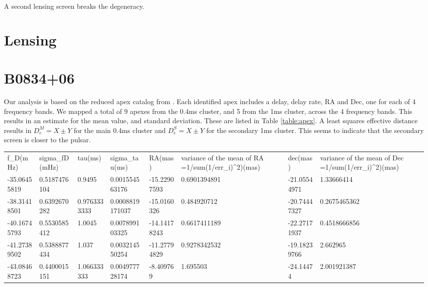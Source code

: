 \documentclass[useAMS,usenatbib]{mn2e}
\begin{document}
A second lensing screen breaks the degeneracy.

\section{Lensing}

\section{B0834+06}

Our analysis is based on the reduced apex catalog from
\citet{2010ApJ...708..232B}. Each identified apex includes a delay,
delay rate, RA and Dec, one for each of 4 frequency bands.  We mapped
a total of 9 apexes from the 0.4ms cluster, and 5 from the 1ms
cluster, across the 4 frequency bands.  This results in an estimate
for the mean value, and standard deviation.  These are listed in Table
\ref{table:apex}.  A least squares effective distance results in
$D_e^M=X\pm Y$ for the main 0.4ms cluster and $D_e^S = X \pm Y$ for
the secondary 1ms cluster.  This seems to indicate that the secondary
screen is closer to the pulsar.

\begin{table}[h]
\begin{tabular}{llllllll}
f\_D(mHz)    & sigma\_fD(mHz) & tau(ms)      & sigma\_tau(ms)  & RA(mas)      & variance of the mean of RA =1/sum(1/err\_i)\textasciicircum 2)(mas) & dec(mas)     & variance of the mean of Dec =1/sum(1/err\_i)\textasciicircum 2)(mas) \\
-35.06455819 & 0.5187476104   & 0.9495       & 0.001554563176  & -15.22907593 & 0.6901394891                                                        & -21.05544971 & 1.33666414                                                           \\
-38.31418501 & 0.6392670282   & 0.9763333333 & 0.0008819171037 & -15.0160326  & 0.484920712                                                         & -20.74447327 & 0.2675465362                                                         \\
-40.16745793 & 0.5530585412   & 1.0045       & 0.007899103325  & -14.14178243 & 0.6617411189                                                        & -22.27171937 & 0.4518666856                                                         \\
-41.27389502 & 0.5388877434   & 1.037        & 0.003214550254  & -11.27794829 & 0.9278342532                                                        & -19.18239766 & 2.662965                                                             \\
-43.08468723 & 0.4400015151   & 1.066333333  & 0.004977728174  & -8.409769    & 1.695503                                                            & -24.14474    & 2.001921387                                                         
\end{tabular}
\end{table}
\end{document}
